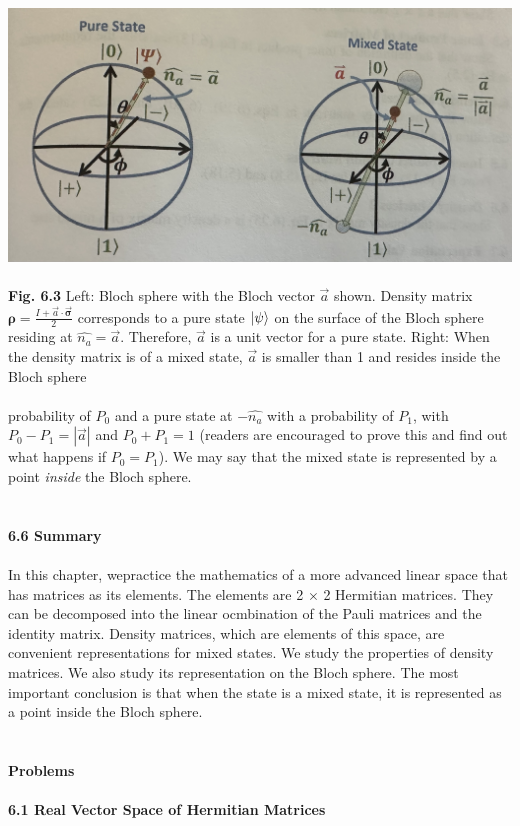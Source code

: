 \documentclass{article}
\begin{document}
\includegraphics[scale=0.4]{Fig 6.3.jpeg}
\\\\
\textbf{Fig. 6.3} Left: Bloch sphere with the Bloch vector $\vec{a}$ shown. 
Density matrix  $\boldsymbol{\rho}=\frac{I+\vec{a}\cdot\vec{\boldsymbol{\sigma}}}{2}$ 
corresponds to a pure state $\ket{\psi}$ on the surface of the Bloch sphere residing at
$\hat{n_a}=\vec{a}$. Therefore, $\vec{a}$ is a unit vector for a pure state. Right: When the 
density matrix is of a mixed state, $\vec{a}$ is smaller than 1 and resides inside the Bloch sphere\\\\
probability of $P_0$ and a pure state at $-\hat{n_a}$ with a probability of 
$P_1$, with $P_0-P_1=|\vec{a}|$ and $P_0+P_1=1$ (readers are encouraged to prove this and 
find out what happens if $P_0=P_1$). We may say that the mixed state is represented by a point 
\textit{inside} the Bloch sphere.\\\\\\
\textbf{\large 6.6 Summary}\\\\
In this chapter, wepractice the mathematics of a more advanced linear space
that has matrices as its elements. The elements are 2 $\times$ 2 Hermitian matrices.
They can be decomposed into the linear ocmbination of the Pauli matrices and the 
identity matrix. Density matrices, which are elements of this space, are convenient representations
for mixed states. We study the properties of density matrices. We also study its representation on the
Bloch sphere. The most important conclusion is that when the state is a mixed state,
it is represented as a point inside the Bloch sphere.\\\\\\
\textbf{Problems}\\\\
\textbf{6.1 Real Vector Space of Hermitian Matrices}
\end{document}

